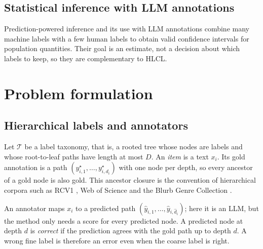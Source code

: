 \documentclass[preprint,12pt]{elsarticle}
\theoremstyle{definition}
\newcommand{\hlcl}{\textup{\textsc{HLCL}}}
\begin{document}
\subsection{Statistical inference with LLM annotations}
Prediction-powered inference \citep{angelopoulos2023ppi} and its use with LLM
annotations \citep{gligoric2025unconfident} combine many machine labels with a
few human labels to obtain valid confidence intervals for population quantities.
Their goal is an estimate, not a decision about which labels to keep, so they
are complementary to \hlcl{}.

\section{Problem formulation}
\label{sec:setting}

\subsection{Hierarchical labels and annotators}

Let $\mathcal{T}$ be a label taxonomy, that is, a rooted tree whose nodes are
labels and whose root-to-leaf paths have length at most $D$. An \emph{item} is a
text $x_i$. Its gold annotation is a path $(y^\star_{i,1},\dots,y^\star_{i,d_i})$
with one node per depth, so every ancestor of a gold node is also gold. This
ancestor closure is the convention of hierarchical corpora such as RCV1
\citep{lewis2004rcv1}, Web of Science \citep{kowsari2017hdltex} and the Blurb
Genre Collection \citep{aly2019hierarchical}.

An annotator maps $x_i$ to a predicted path
$(\hat y_{i,1},\dots,\hat y_{i,\hat d_i})$; here it is an LLM, but the method
only needs a score for every predicted node. A predicted node at depth $d$ is
\emph{correct} if the prediction agrees with the gold path up to depth $d$. A
wrong fine label is therefore an error even when the coarse label is right.
\end{document}
